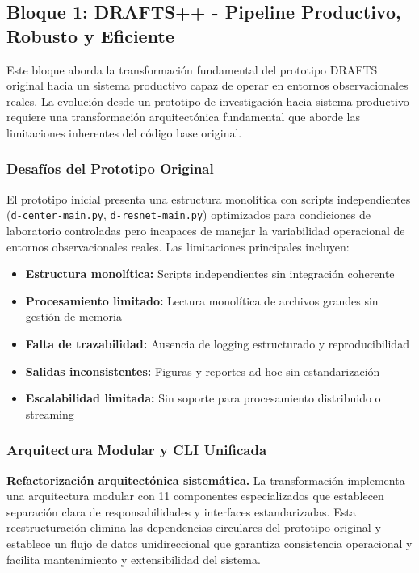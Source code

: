 \subsection{Bloque 1: DRAFTS++ - Pipeline Productivo, Robusto y Eficiente}

Este bloque aborda la transformación fundamental del prototipo DRAFTS original hacia un sistema productivo capaz de operar en entornos observacionales reales. La evolución desde un prototipo de investigación hacia sistema productivo requiere una transformación arquitectónica fundamental que aborde las limitaciones inherentes del código base original.

\subsubsection{Desafíos del Prototipo Original}

El prototipo inicial presenta una estructura monolítica con scripts independientes (\texttt{d-center-main.py}, \texttt{d-resnet-main.py}) optimizados para condiciones de laboratorio controladas pero incapaces de manejar la variabilidad operacional de entornos observacionales reales. Las limitaciones principales incluyen:

\begin{itemize}
\item \textbf{Estructura monolítica:} Scripts independientes sin integración coherente
\item \textbf{Procesamiento limitado:} Lectura monolítica de archivos grandes sin gestión de memoria
\item \textbf{Falta de trazabilidad:} Ausencia de logging estructurado y reproducibilidad
\item \textbf{Salidas inconsistentes:} Figuras y reportes ad hoc sin estandarización
\item \textbf{Escalabilidad limitada:} Sin soporte para procesamiento distribuido o streaming
\end{itemize}

\subsubsection{Arquitectura Modular y CLI Unificada}

\noindent\textbf{Refactorización arquitectónica sistemática.} La transformación implementa una arquitectura modular con 11 componentes especializados que establecen separación clara de responsabilidades y interfaces estandarizadas. Esta reestructuración elimina las dependencias circulares del prototipo original y establece un flujo de datos unidireccional que garantiza consistencia operacional y facilita mantenimiento y extensibilidad del sistema.

